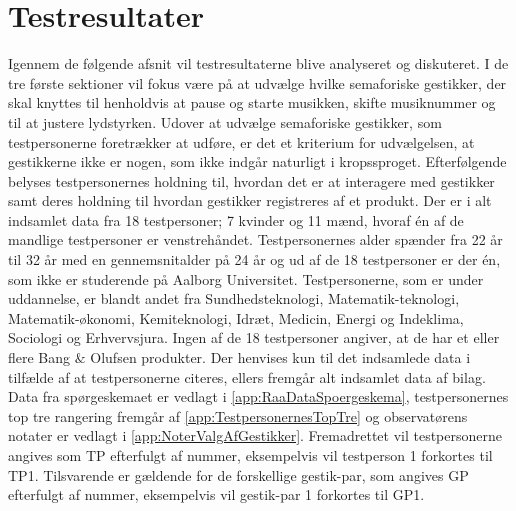 \chapter{Testresultater}
\label{Testresultater}
%
Igennem de følgende afsnit vil testresultaterne blive analyseret og diskuteret. I de tre første sektioner vil fokus være på at udvælge hvilke semaforiske gestikker, der skal knyttes til henholdvis at pause og starte musikken, skifte musiknummer og til at justere lydstyrken. Udover at udvælge semaforiske gestikker, som testpersonerne foretrækker at udføre, er det et kriterium for udvælgelsen, at gestikkerne ikke er nogen, som ikke indgår naturligt i kropssproget. Efterfølgende belyses testpersonernes holdning til, hvordan det er at interagere med gestikker samt deres holdning til hvordan gestikker registreres af et produkt.\blankline
%
Der er i alt indsamlet data fra 18 testpersoner; 7 kvinder og 11 mænd, hvoraf én af de mandlige testpersoner er venstrehåndet. Testpersonernes alder spænder fra 22 år til 32 år med en gennemsnitalder på 24 år og ud af de 18 testpersoner er der én, som ikke er studerende på Aalborg Universitet. Testpersonerne, som er under uddannelse, er blandt andet fra Sundhedsteknologi, Matematik-teknologi, Matematik-økonomi, Kemiteknologi, Idræt, Medicin, Energi og Indeklima, Sociologi og Erhvervsjura. Ingen af de 18 testpersoner angiver, at de har et eller flere Bang $\&$ Olufsen produkter. Der henvises kun til det indsamlede data i tilfælde af at testpersonerne citeres, ellers fremgår alt indsamlet data af bilag. Data fra spørgeskemaet er vedlagt i \autoref{app:RaaDataSpoergeskema}, testpersonernes top tre rangering fremgår af \autoref{app:TestpersonernesTopTre} og observatørens notater er vedlagt i \autoref{app:NoterValgAfGestikker}. Fremadrettet vil testpersonerne angives som TP efterfulgt af nummer, eksempelvis vil testperson 1 forkortes til TP1. Tilsvarende er gældende for de forskellige gestik-par, som angives GP efterfulgt af nummer, eksempelvis vil gestik-par 1 forkortes til GP1.      